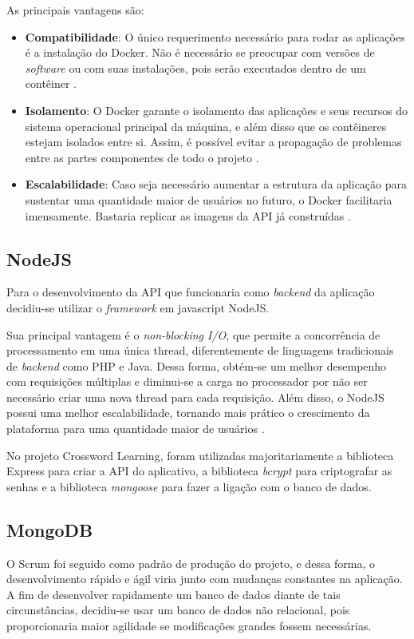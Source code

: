 As principais vantagens são:

\begin{itemize}
    \item \textbf{Compatibilidade}: O único requerimento necessário para rodar as aplicações é a instalação do Docker. Não é necessário se preocupar com versões de \textit{software} ou com suas instalações, pois serão executados dentro de um contêiner \citep{vase2015advantages}.
    
    \item \textbf{Isolamento}: O Docker garante o isolamento das aplicações e seus recursos do sistema operacional principal da máquina, e além disso que os contêineres estejam isolados entre si. Assim, é possível evitar a propagação de problemas entre as partes componentes de todo o projeto \citep{merkel2014docker}.
    
    \item \textbf{Escalabilidade}: Caso seja necessário aumentar a estrutura da aplicação para sustentar uma quantidade maior de usuários no futuro, o Docker facilitaria imensamente. Bastaria replicar as imagens da API já construídas \citep{vase2015advantages}.
\end{itemize}


\subsection{NodeJS}
Para o desenvolvimento da API que funcionaria como \textit{backend} da aplicação decidiu-se utilizar o \textit{framework} em javascript NodeJS. 

Sua principal vantagem é o \textit{non-blocking I/O}, que permite a concorrência
de processamento em uma única thread, diferentemente de linguagens tradicionais de \textit{backend} como PHP e Java. Dessa forma, obtém-se um melhor desempenho com requisições múltiplas e diminui-se a carga no processador por não ser necessário criar uma nova thread para cada requisição. Além disso, o NodeJS possui uma melhor escalabilidade,
tornando mais prático o crescimento da plataforma para uma quantidade maior de usuários \citep{node_benefits}.

No projeto Crossword Learning, foram utilizadas majoritariamente a biblioteca Express para criar a API do aplicativo, a biblioteca \textit{bcrypt} para criptografar as senhas e a biblioteca \textit{mongoose} para fazer a ligação com o banco de dados.

\subsection{MongoDB}
O Scrum foi seguido como padrão de produção do projeto, e dessa forma, o desenvolvimento rápido e ágil viria junto com mudanças constantes na aplicação.
A fim de desenvolver rapidamente um banco de dados diante de tais circunstâncias, decidiu-se usar um banco de dados não relacional, pois proporcionaria maior agilidade se modificações grandes fossem necessárias.

